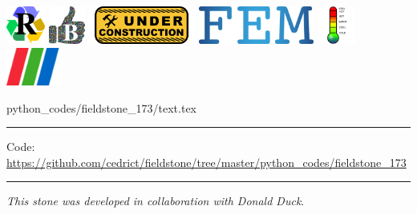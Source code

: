 \noindent
\includegraphics[height=1.25cm]{images/pictograms/replication}
\includegraphics[height=1.25cm]{images/pictograms/benchmark}
\includegraphics[height=1.25cm]{images/pictograms/under_construction}
\includegraphics[height=1.25cm]{images/pictograms/FEM}
\includegraphics[height=1.25cm]{images/pictograms/temperature}
\includegraphics[height=1.25cm]{images/pictograms/paraview}


\begin{flushright} {\tiny {\color{gray} python\_codes/fieldstone\_173/text.tex}} \end{flushright}

%

\par\noindent\rule{\textwidth}{0.4pt}

\begin{center}
\inpython
{\small Code: \url{https://github.com/cedrict/fieldstone/tree/master/python_codes/fieldstone_173}}
\end{center}

\par\noindent\rule{\textwidth}{0.4pt}

{\sl This stone was developed in collaboration with Donald Duck}. 

